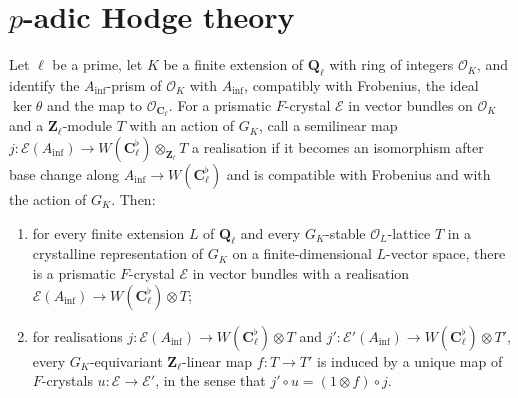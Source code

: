 \section{$p$-adic Hodge theory}\label{section-lit-hodge}

\begin{theorem}\label{lit-bhatt-scholze}
Let $\ell$ be a prime, let $K$ be a finite extension of $\mathbf Q_\ell$ with
ring of integers $\mathcal O_K$, and identify the $A_{\inf}$-prism of
$\mathcal O_K$ with $A_{\inf}$, compatibly with Frobenius, the ideal
$\ker\theta$ and the map to $\mathcal O_{\mathbf C_\ell}$. For a prismatic
$F$-crystal $\mathcal E$ in vector bundles on $\mathcal O_K$ and a
$\mathbf Z_\ell$-module $T$ with an action of $G_K$, call a semilinear map
$j:\mathcal E(A_{\inf})\to W(\mathbf C_\ell^\flat)\otimes_{\mathbf Z_\ell}T$ a
realisation if it becomes an isomorphism after base change along
$A_{\inf}\to W(\mathbf C_\ell^\flat)$ and is compatible with Frobenius and
with the action of $G_K$. Then:
\begin{enumerate}
\item for every finite extension $L$ of $\mathbf Q_\ell$ and every
  $G_K$-stable $\mathcal O_L$-lattice $T$ in a crystalline representation of
  $G_K$ on a finite-dimensional $L$-vector space, there is a prismatic
  $F$-crystal $\mathcal E$ in vector bundles with a realisation
  $\mathcal E(A_{\inf})\to W(\mathbf C_\ell^\flat)\otimes T$;
\item for realisations $j:\mathcal E(A_{\inf})\to W(\mathbf C_\ell^\flat)\otimes T$
  and $j':\mathcal E'(A_{\inf})\to W(\mathbf C_\ell^\flat)\otimes T'$, every
  $G_K$-equivariant $\mathbf Z_\ell$-linear map $f:T\to T'$ is induced by a
  unique map of $F$-crystals $u:\mathcal E\to\mathcal E'$, in the sense that
  $j'\circ u=(1\otimes f)\circ j$.
\end{enumerate}
\end{theorem}

